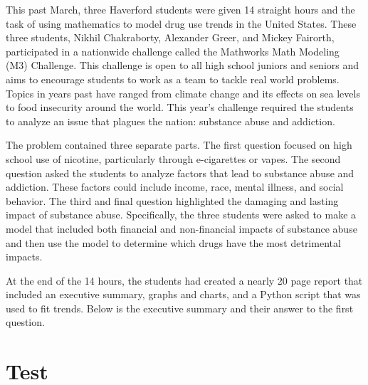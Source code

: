 
This past March, three Haverford students were given 14 straight hours and the task of using mathematics to model drug use trends in the United States. These three students, Nikhil Chakraborty, Alexander Greer, and Mickey Fairorth, participated in a nationwide challenge called the Mathworks Math Modeling (M3) Challenge. This challenge is open to all high school juniors and seniors and aims to encourage students to work as a team to tackle real world problems. Topics in years past have ranged from climate change and its effects on sea levels to food insecurity around the world. This year’s challenge required the students to analyze an issue that plagues the nation: substance abuse and addiction.

The problem contained three separate parts. The first question focused on high school use of nicotine, particularly through e-cigarettes or vapes. The second question asked the students to analyze factors that lead to substance abuse and addiction. These factors could include income, race, mental illness, and social behavior. The third and final question highlighted the damaging and lasting impact of substance abuse. Specifically, the three students were asked to make a model that included both financial and non-financial impacts of substance abuse and then use the model to determine which drugs have the most detrimental impacts.

At the end of the 14 hours, the students had created a nearly 20 page report that included an executive summary, graphs and charts, and a Python script that was used to fit trends. Below is the executive summary and their answer to the first question.

\section{Test}


\setcounter{section}{0}
